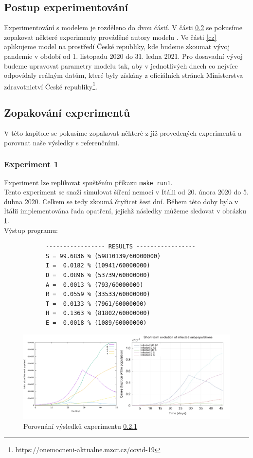 \documentclass[a4paper,11pt]{article}
\begin{document}
		\subsection{Postup experimentování}
			Experimentování s modelem je rozděleno do dvou částí. V části \ref{rep} se pokusíme zopakovat některé experimenty prováděné autory modelu \cite{source}. Ve části \ref{cz} aplikujeme model na prostředí České republiky, kde budeme zkoumat vývoj pandemie v období od 1. listopadu 2020 do 31. ledna 2021. Pro dosavadní vývoj budeme upravovat parametry modelu tak, aby v jednotlivých dnech co nejvíce odpovídaly reálným datům, které byly získány z oficiálních stránek Ministerstva zdravotnictví České republiky\footnote{https://onemocneni-aktualne.mzcr.cz/covid-19}.
		
		\subsection{Zopakování experimentů}
		\label{rep}
		V této kapitole se pokusíme zopakovat některé z již provedených experimentů a porovnat naše výsledky s referenčními.
	
		\subsubsection{Experiment 1}
		\label{e1}
			Experiment lze replikovat spuštěním příkazu \texttt{make run1}.\\
		
			Tento experiment se snaží simulovat šíření nemoci v Itálii od 20. února 2020 do 5. dubna 2020. Celkem se tedy zkoumá čtyřicet šest dní. Během této doby byla v Itálii implementována řada opatření, jejichž následky můžeme sledovat v obrázku \ref{fig2}.\\
			
			\noindent Výstup programu:
			\begin{verbatim}
			----------------- RESULTS -----------------
			S = 99.6836 % (59810139/60000000)
			I =  0.0182 % (10941/60000000)
			D =  0.0896 % (53739/60000000)
			A =  0.0013 % (793/60000000)
			R =  0.0559 % (33533/60000000)
			T =  0.0133 % (7961/60000000)
			H =  0.1363 % (81802/60000000)
			E =  0.0018 % (1089/60000000)
			\end{verbatim}
			
			\begin{figure}[H]
				\caption{Porovnání výsledků experimentu \ref{e1}}
				\label{fig2}
				\centering
				\includegraphics[scale=0.6]{comparison.png}
			\end{figure}
			
\end{document}
